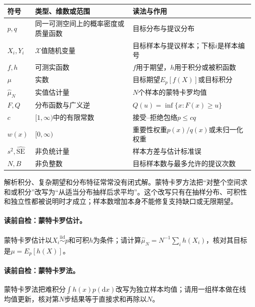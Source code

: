 \begin{symboltablebox}
\small
\begin{tabularx}{\linewidth}{@{}l l X@{}}
\toprule 符号 & 类型、维数或范围 & 读法与作用\\ \midrule
$p,q$ & 同一可测空间上的概率密度或质量函数 & 目标分布与提议分布\\
$X_i,Y_i$ & $\mathcal X$值随机变量 & 目标样本与提议样本；下标$i$是样本编号\\
$f,h$ & 可测实函数 & $f$用于期望，$h$用于积分或被积函数\\
$\mu$ & 实数 & 目标期望$E_p[f(X)]$或目标积分\\
$\widehat\mu_N$ & 实值估计量 & $N$个样本的蒙特卡罗均值\\
$F,Q$ & 分布函数与广义逆 & $Q(u)=\inf\{x:F(x)\ge u\}$\\
$c$ & $[1,\infty)$中的有限常数 & 接受--拒绝包络$p\le cq$\\
$w(x)$ & $[0,\infty)$ & 重要性权重$p(x)/q(x)$或未归一化权重\\
$s^2,\widehat{\mathrm{SE}}$ & 非负统计量 & 样本方差与估计标准误\\
$N,B$ & 非负整数 & 目标样本数与最多允许的提议次数\\
\bottomrule
\end{tabularx}
\end{symboltablebox}

\label{struct:V5-C02-CH06}
解析积分、复杂期望和分布特征常常没有闭式解。蒙特卡罗方法把“对整个空间求和或积分”改写为“从适当分布抽样后求平均”。这个改写只有在抽样分布、可积性和独立性都被说明时才成立；样本数增加本身不能修复支持缺口或无限期望。

\paragraph{读前自检：蒙特卡罗估计。}蒙特卡罗估计以$X_i\stackrel{\mathrm{iid}}{\sim}p$和可积$h$为条件；请计算$\widehat\mu_N=N^{-1}\sum_i h(X_i)$，核对其目标是$\mu=E_p[h(X)]$。\par
\paragraph{读前自检：蒙特卡罗法。}蒙特卡罗法把难积分$\int h(x)p(\mathrm dx)$改写为独立样本均值；请用一组样本做在线均值更新，核对第$N$步结果等于直接求和再除以$N$。\par
